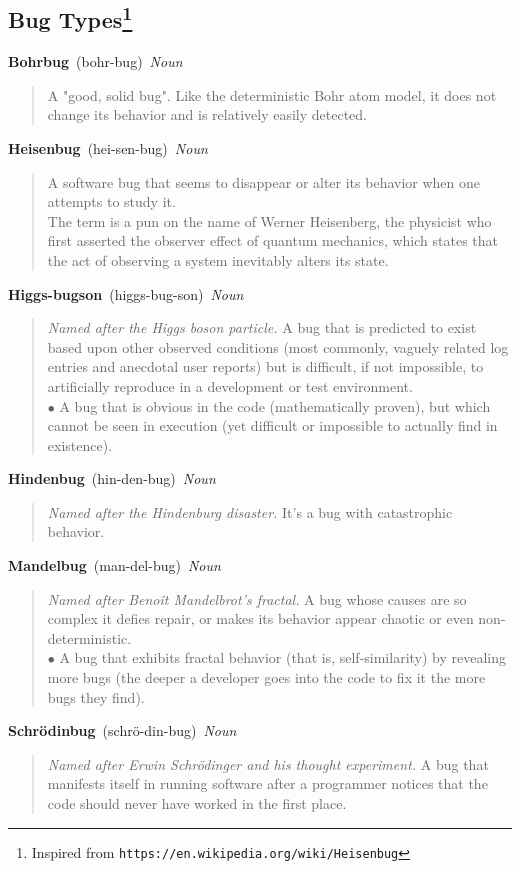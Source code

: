 \documentclass[10pt,a4paper,twoside]{article} %
\newcommand{\entry}[4]{
    \textbf{#1}\ {(#2)}\ \textit{#3}
{
    \begin{quote}
        #4
    \end{quote}
}}
\begin{document}


\begin{landscape}

\section*{Bug Types\footnote{Inspired from \texttt{https://en.wikipedia.org/wiki/Heisenbug}}}


    \entry{Bohrbug}{bohr-bug}{Noun}
    {
        A "good, solid bug".
        Like the deterministic Bohr atom model, it does not change its
        behavior and is relatively easily detected.
    }

    \entry{Heisenbug}{hei-sen-bug}{Noun}
    {
        A software bug that seems to disappear or alter its behavior when one
        attempts to study it. \\
        The term is a pun on the name of Werner Heisenberg, the physicist who
        first asserted the observer effect of quantum mechanics, which states
        that the act of observing a system inevitably alters its state.
    }

    \entry{Higgs-bugson}{higgs-bug-son}{Noun}
    {
        \emph{Named after the Higgs boson particle.}
        A bug that is predicted to exist based upon other observed conditions
        (most commonly, vaguely related log entries and anecdotal user reports)
        but is difficult, if not impossible, to artificially reproduce in a
        development or test environment. \\
        $\bullet$ A bug that is obvious in the code (mathematically proven), but which
        cannot be seen in execution (yet difficult or impossible to actually
        find in existence).
    }

    \entry{Hindenbug}{hin-den-bug}{Noun}
    {
        \emph{Named after the Hindenburg disaster.}
        It's a bug with catastrophic behavior.
    }

    \entry{Mandelbug}{man-del-bug}{Noun}
    {
        \emph{Named after Benoît Mandelbrot's fractal.}
        A bug whose causes are so complex it defies repair, or makes its
        behavior appear chaotic or even non-deterministic. \\
        $\bullet$ A bug that exhibits fractal behavior (that is, self-similarity) by
        revealing more bugs (the deeper a developer goes into the code to fix
        it the more bugs they find).
    }

    \entry{Schrödinbug}{schrö-din-bug}{Noun}
    {
        \emph{Named after Erwin Schrödinger and his thought experiment.}
        A bug that manifests itself in running software after a programmer
        notices that the code should never have worked in the first place.
    }

\end{landscape}
\end{document}
